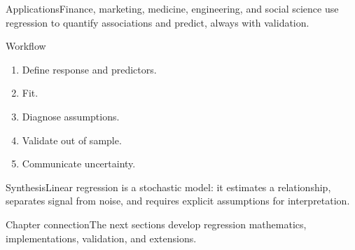\documentclass[10pt,aspectratio=169]{beamer}
\begin{document}
\begin{frame}{Applications}\small Finance, marketing, medicine, engineering, and social science use regression to quantify associations and predict, always with validation.\end{frame}
\begin{frame}{Workflow}\small\begin{enumerate}\item Define response and predictors.\item Fit.\item Diagnose assumptions.\item Validate out of sample.\item Communicate uncertainty.\end{enumerate}\end{frame}
\begin{frame}{Synthesis}\small Linear regression is a stochastic model: it estimates a relationship, separates signal from noise, and requires explicit assumptions for interpretation.\end{frame}
\begin{frame}{Chapter connection}\small The next sections develop regression mathematics, implementations, validation, and extensions.\end{frame}
\end{document}
